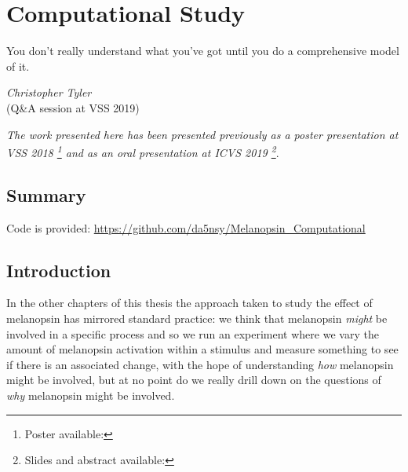 \chapter{Computational Study}
\label{chap:Melcomp}

\epigraph{You don't really understand what you've got until you do a comprehensive model of it.}
{\textit{Christopher Tyler} \\ (Q\&A session at VSS 2019)}

\textit{The work presented here has been presented previously as a poster presentation at VSS 2018 \citep{garside_does_2018}\footnote{Poster available: } and as an oral presentation at ICVS 2019 \footnote{Slides and abstract available: }}.

\section{Summary}



Code is provided: \url{https://github.com/da5nsy/Melanopsin_Computational}

\section{Introduction}

In the other chapters of this thesis the approach taken to study the effect of melanopsin has mirrored standard practice: we think that melanopsin \emph{might} be involved in a specific process and so we run an experiment where we vary the amount of melanopsin activation within a stimulus and measure something to see if there is an associated change, with the hope of understanding \emph{how} melanopsin might be involved, but at no point do we really drill down on the questions of \emph{why} melanopsin might be involved.

